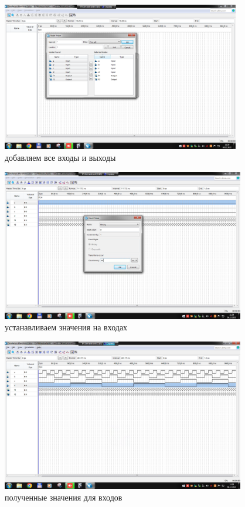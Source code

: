 \documentclass[a4paper]{article}
\begin{document}
  \begin{figure}[H]
    \centering
    \includegraphics[width=0.93\textwidth]{02_32}
    \caption{добавляем все входы и выходы}
  \end{figure}

  \begin{figure}[H]
    \centering
    \includegraphics[width=0.9475\textwidth]{02_33}
    \caption{устанавливаем значения на входах}
  \end{figure}

  \begin{figure}[H]
    \centering
    \includegraphics[width=0.9475\textwidth]{02_34}
    \caption{полученные значения для входов}
  \end{figure}
\end{document}
